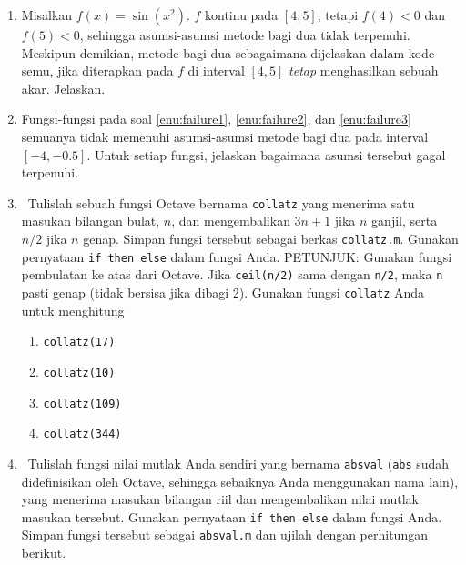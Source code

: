 \begin{enumerate}
\begin{enumerate}
\item Gunakan grafik fungsi di sekitar $4$ untuk menjelaskan mengapa demikian.
Anda dapat menggunakan kode Octave di bawah ini untuk membuat grafik
yang sesuai.
\item Meskipun demikian, jalankan metode bagi dua pada $g$ untuk interval
$[3.5,4.5]$. Apa yang terjadi alih-alih metode tersebut menemukan
akar?
\end{enumerate}
\begin{verbatim}
x=3.5:.05:4.5;
f=@(x) abs(sin(pi*x));
plot(x,f(x)) 
\end{verbatim}
\item \label{exc:bisection-4}Misalkan $f(x)=\sin(x^{2})$. $f$ kontinu
pada $[4,5]$, tetapi $f(4)<0$ dan $f(5)<0$, sehingga asumsi-asumsi
metode bagi dua tidak terpenuhi. Meskipun demikian, metode bagi dua
sebagaimana dijelaskan dalam kode semu, jika diterapkan pada $f$
di interval $[4,5]$ \textit{tetap} menghasilkan sebuah akar. Jelaskan. \hasasolution 
\item Fungsi-fungsi pada soal \ref{enu:failure1}, \ref{enu:failure2},
dan \ref{enu:failure3} semuanya tidak memenuhi asumsi-asumsi metode
bagi dua pada interval $[-4,-0.5]$. Untuk setiap fungsi, jelaskan
bagaimana asumsi tersebut gagal terpenuhi.
\item \label{exc:bisection-5}\octave\ Tulislah sebuah fungsi Octave bernama
\texttt{collatz} yang menerima satu masukan bilangan bulat, $n$,
dan mengembalikan $3n+1$ jika $n$ ganjil, serta $n/2$ jika $n$
genap. Simpan fungsi tersebut sebagai berkas \texttt{collatz.m}. Gunakan
pernyataan \texttt{if then else} dalam fungsi Anda. PETUNJUK: Gunakan
fungsi pembulatan ke atas dari Octave. Jika \texttt{ceil(n/2)} sama
dengan \texttt{n/2}, maka \texttt{n} pasti genap (tidak bersisa jika
dibagi 2). Gunakan fungsi \texttt{collatz} Anda untuk menghitung \hasananswer 

\begin{enumerate}
\item \texttt{collatz(17)}
\item \texttt{collatz(10)}
\item \texttt{collatz(109)}
\item \texttt{collatz(344)}
\end{enumerate}
\item \octave\ Tulislah fungsi nilai mutlak Anda sendiri yang bernama \texttt{absval}
(\texttt{abs} sudah didefinisikan oleh Octave, sehingga sebaiknya
Anda menggunakan nama lain), yang menerima masukan bilangan riil dan
mengembalikan nilai mutlak masukan tersebut. Gunakan pernyataan \texttt{if
then else} dalam fungsi Anda. Simpan fungsi tersebut sebagai \texttt{absval.m}
dan ujilah dengan perhitungan berikut. 


\end{enumerate}
